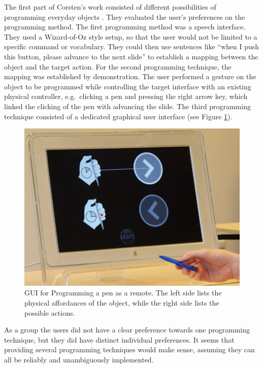 The first part of Corsten's work consisted of different possibilities of programming everyday objects \cite{corsten13}.
They evaluated the user's preferences on the programming method.
The first programming method was a speech interface.
They used a Wizard-of-Oz style setup, so that the user would not be limited to a specific command or vocabulary.
They could then use sentences like ``when I push this button, please advance to the next slide'' to establish a mapping between the object and the target action.
For the second programming technique, the mapping was established by demonstration.
The user performed a gesture on the object to be programmed while controlling the target interface with an existing physical controller, e.g.\ clicking a pen and pressing the right arrow key, which linked the clicking of the pen with advancing the slide.
The third programming technique consisted of a dedicated graphical user interface (see Figure \ref{fig:iuigui}).
\begin{figure}[!t]
	\centering
	\includegraphics[width=0.9\columnwidth]{Images/IUIGui}
	\caption{GUI for Programming a pen as a remote. The left side lists the physical affordances of the object, while the right side lists the possible actions. \cite{corsten13}}
	\label{fig:iuigui}
\end{figure}

As a group the users did not have a clear preference towards one programming technique, but they did have distinct individual preferences.
It seems that providing several programming techniques would make sense, assuming they can all be reliably and unambiguously implemented.

